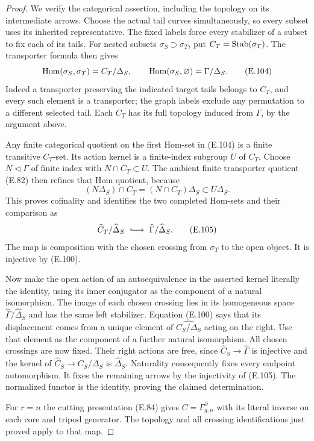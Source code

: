 \begin{proof}
We verify the categorical assertion, including the topology
on its intermediate arrows.  Choose the actual tail curves
simultaneously, so every subset uses its inherited
representative.  The fixed labels force every stabilizer
of a subset to fix each of its tails.  For nested subsets
$\sigma_S\supset\sigma_T$, put
$C_T=\operatorname{Stab}(\sigma_T)$.  The transporter formula then gives
\[
 \operatorname{Hom}(\sigma_S,\sigma_T)=C_T/\Delta_S,
 \qquad
 \operatorname{Hom}(\sigma_S,\varnothing)=\Gamma/\Delta_S.                  \tag{E.104}
\]
Indeed a transporter preserving the indicated target tails
belongs to $C_T$, and every such element is a transporter;
the graph labels exclude any permutation to a different
selected tail.  Each $C_T$ has its full topology induced
from $\Gamma$, by the argument above.

Any finite categorical quotient on the first Hom-set in
(E.104) is a finite transitive $C_T$-set.  Its action kernel
is a finite-index subgroup $U$ of $C_T$.
Choose $N\triangleleft\Gamma$ of finite index with
$N\cap C_T\subset U$.  The ambient finite transporter
quotient (E.82) then refines that Hom quotient, because
\[
       (N\Delta_S)\cap C_T=(N\cap C_T)\Delta_S
                                  \subset U\Delta_S.
\]
This proves cofinality and identifies the two completed
Hom-sets and their comparison as
\[
  \widehat C_T/\widehat\Delta_S
       \ \lhook\joinrel\longrightarrow\
       \widehat\Gamma/\widehat\Delta_S.                      \tag{E.105}
\]
The map is composition with the chosen crossing from
$\sigma_T$ to the open object.  It is injective by (E.100).

Now make the open action of an autoequivalence in the
asserted kernel literally the identity, using its inner
conjugator as the component of a natural isomorphism.
The image of each chosen crossing lies in its homogeneous
space $\widehat\Gamma/\widehat\Delta_S$ and has the same
left stabilizer.  Equation (E.100) says that its displacement
comes from a unique element of
$\widehat{C_S/\Delta_S}$ acting on the right.
Use that element as the component of a further natural
isomorphism.  All chosen crossings are now fixed.
Their right actions are free, since
$\widehat C_S\to\widehat\Gamma$ is injective and the
kernel of $\widehat C_S\to\widehat{C_S/\Delta_S}$ is
$\widehat\Delta_S$.  Naturality consequently fixes every
endpoint automorphism.  It fixes the remaining arrows
by the injectivity of (E.105).  The normalized functor is
the identity, proving the claimed determination.

For $r=n$ the cutting presentation (E.84) gives
$C=\Gamma_{g,n}^{\partial}$ with its literal inverse on
each core and tripod generator.  The topology and all
crossing identifications just proved apply to that map.
\end{proof}

